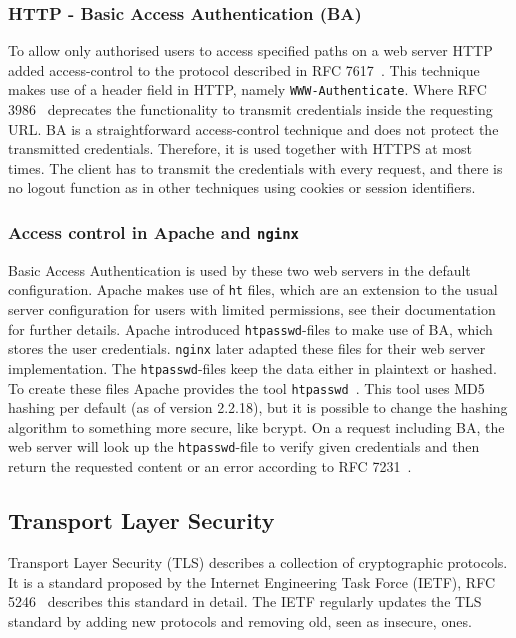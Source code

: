 \subsubsection{HTTP - Basic Access Authentication (BA)}

To allow only authorised users to access specified paths on a web server HTTP
added access-control to the protocol described in RFC 7617~\cite{rfc7617}. This
technique makes use of a header field in HTTP, namely \texttt{WWW-Authenticate}.
Where RFC 3986~\cite{rfc3986} deprecates the functionality to transmit
credentials inside the requesting URL. BA is a straightforward access-control
technique and does not protect the transmitted credentials. Therefore, it is
used together with HTTPS at most times. The client has to transmit the
credentials with every request, and there is no logout function as in other
techniques using cookies or session identifiers.

\subsubsection{Access control in Apache and \texttt{nginx}}

Basic Access Authentication is used by these two web servers in the default
configuration. Apache makes use of \texttt{ht} files, which are an extension to
the usual server configuration for users with limited permissions, see
their documentation~\cite{apacheauthdoc} for further details. Apache introduced
\texttt{htpasswd}-files to make use of BA, which stores the user credentials.
\texttt{nginx} later adapted these files for their web server implementation.
The \texttt{htpasswd}-files keep the data either in plaintext or hashed. To
create these files Apache provides the tool
\texttt{htpasswd}~\cite{htpasswddoc}. This tool uses MD5 hashing per default (as
of version 2.2.18), but it is possible to change the hashing algorithm to
something more secure, like bcrypt. On a request including BA, the web server
will look up the \texttt{htpasswd}-file to verify given credentials and then
return the requested content or an error according to RFC 7231~\cite{rfc7231}.

\subsection{Transport Layer Security}

Transport Layer Security (TLS) describes a collection of cryptographic
protocols. It is a standard proposed by the Internet Engineering Task Force
(IETF), RFC 5246~\cite{rfc5246} describes this standard in detail. The IETF
regularly updates the TLS standard by adding new protocols and removing old,
seen as insecure, ones.

